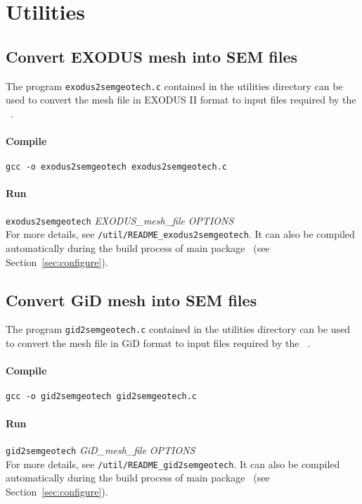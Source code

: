 \chapter{Utilities}
\label{chap:utilities}
\section{Convert EXODUS mesh into SEM files}

The program \texttt{exodus2semgeotech.c} contained in the utilities directory can be used to convert the mesh file in EXODUS II format to input files required by the \pack\ .

\subsubsection*{Compile}
\texttt{gcc -o exodus2semgeotech exodus2semgeotech.c}
\subsubsection*{Run}
 \texttt{exodus2semgeotech} {\emph{EXODUS\_mesh\_file}} {\emph{OPTIONS}}\\
 For more details, see \texttt{/util/README\_exodus2semgeotech}. It can also be compiled automatically during the build process of main package \pack\ (see Section~\ref{sec:configure}).

\section{Convert GiD mesh into SEM files}

The program \texttt{gid2semgeotech.c} contained in the utilities directory can be used to convert the mesh file in GiD format to input files required by the \pack\ .

\subsubsection*{Compile}
\texttt{gcc -o gid2semgeotech gid2semgeotech.c}
\subsubsection*{Run}
 \texttt{gid2semgeotech} {\emph{GiD\_mesh\_file}} {\emph{OPTIONS}}\\
 For more details, see \texttt{/util/README\_gid2semgeotech}. It can also be compiled automatically during the build process of main package \pack\ (see Section~\ref{sec:configure}).

